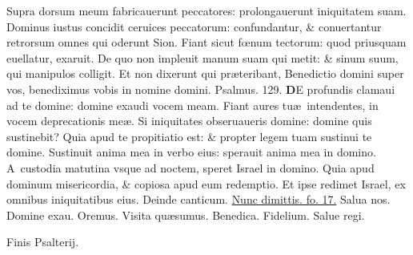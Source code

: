 \documentclass[a5paper,10pt]{book}
\def\ae{æ}
\def\oe{œ}
\begin{document}
\begin{multicols*}{2}
\newline \color{red} S\color{black}upra dorsum meum fabricauerunt peccatores: prolongauerunt iniquitatem suam.
\newline \color{red} D\color{black}ominus iustus concidit ceruices peccatorum: confundantur, \& conuertantur retrorsum omnes qui oderunt Sion.
\newline \color{red} F\color{black}iant sicut f\oe num tectorum: quod priusquam euellatur, exaruit.
\newline \color{red} D\color{black}e quo non impleuit manum suam qui metit: \& sinum suum, qui manipulos colligit.
\newline \color{red} E\color{black}t non dixerunt qui pr\ae teribant, Benedictio domini super vos, benediximus vobis in nomine domini. \color{red} Psalmus. \hypertarget{ps129}{129.} \color{black}
\vspace{-1.5em}
\lettrine[lines=2]{\bfseries \color{red} D}{}E profundis clamaui ad te domine: domine exaudi vocem meam.
\newline \color{red} F\color{black}iant aures tu\ae \ intendentes, in vocem deprecationis me\ae .
\newline \color{red} S\color{black}i iniquitates obseruaueris domine: domine quis sustinebit?
\newline \color{red} Q\color{black}uia apud te propitiatio est: \& propter legem tuam sustinui te domine.
\newline \color{red} S\color{black}ustinuit anima mea in verbo eius: sperauit anima mea in domino.
\newline \color{red} A\color{black}\ custodia matutina vsque ad noctem, speret Israel in domino.
\newline \color{red} Q\color{black}uia apud dominum misericordia, \& copiosa apud eum redemptio.
\newline \color{red} E\color{black}t ipse redimet Israel, ex omnibus iniquitatibus eius.
\newline \color{red} Deinde canticum. \color{black} \hyperlink{Nunc}{Nunc dimittis. fo. 17.} Salua nos. Domine exau. Oremus. Visita qu\ae sumus. Benedica. Fidelium. Salue regi.
\begin{center} \color{red}
Finis Psalterij.
\end{center}
\end{multicols*}
\end{document}
